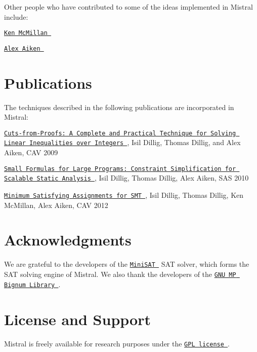 \-Other people who have contributed to some of the ideas implemented in \-Mistral include\-:
\begin{DoxyItemize}
\item \href{http://www.kenmcmil.com/}{\tt \-Ken \-Mc\-Millan }
\item \href{http://theory.stanford.edu/~aiken/}{\tt \-Alex \-Aiken }
\end{DoxyItemize}\hypertarget{index_publications}{}\section{\-Publications}\label{index_publications}
\-The techniques described in the following publications are incorporated in \-Mistral\-:
\begin{DoxyItemize}
\item \href{http://www.cs.wm.edu/~idillig/cav2009.pdf}{\tt \-Cuts-\/from-\/\-Proofs\-: \-A \-Complete and \-Practical \-Technique for \-Solving \-Linear \-Inequalities over \-Integers }, \-Isil \-Dillig, \-Thomas \-Dillig, and \-Alex \-Aiken, \-C\-A\-V 2009
\item \href{http://www.cs.wm.edu/~idillig/sas2010.pdf}{\tt \-Small \-Formulas for \-Large \-Programs\-: \-Constraint \-Simplification for \-Scalable \-Static \-Analysis }, \-Isil \-Dillig, \-Thomas \-Dillig, \-Alex \-Aiken, \-S\-A\-S 2010
\item \href{http://www.cs.wm.edu/~idillig/cav2012.pdf}{\tt \-Minimum \-Satisfying \-Assignments for \-S\-M\-T }, \-Isil \-Dillig, \-Thomas \-Dillig, \-Ken \-Mc\-Millan, \-Alex \-Aiken, \-C\-A\-V 2012 
\end{DoxyItemize}\hypertarget{index_ack}{}\section{\-Acknowledgments}\label{index_ack}
\-We are grateful to the developers of the \href{http://minisat.se/}{\tt \-Mini\-S\-A\-T } \-S\-A\-T solver, which forms the \-S\-A\-T solving engine of \-Mistral. \-We also thank the developers of the \href{http://gmplib.org/}{\tt \-G\-N\-U \-M\-P \-Bignum \-Library }. \hypertarget{index_license}{}\section{\-License and Support}\label{index_license}
\-Mistral is freely available for research purposes under the \href{http://www.gnu.org/licenses/gpl.html}{\tt \-G\-P\-L license }. 
